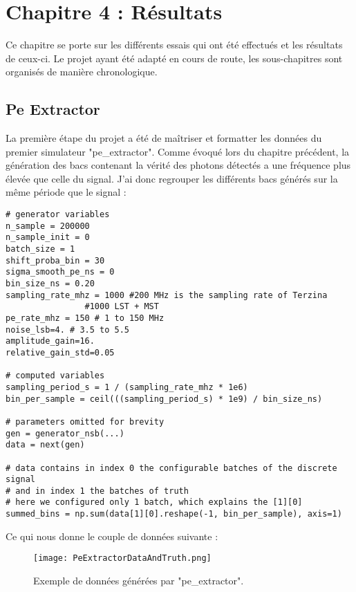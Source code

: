 \chapter{Chapitre 4 : Résultats}

Ce chapitre se porte sur les différents essais qui ont été effectués et les résultats de ceux-ci.
Le projet ayant été adapté en cours de route, les sous-chapitres sont organisés de manière chronologique.

\section{Pe Extractor}
La première étape du projet a été de maîtriser et formatter les données du premier simulateur "pe\_extractor".
Comme évoqué lors du chapitre précédent, la génération des bacs contenant la vérité des photons détectés
a une fréquence plus élevée que celle du signal.
J'ai donc regrouper les différents bacs générés sur la même période que le signal :

\begin{lstlisting}[language=iPython,caption={Regroupement des bacs de photons insérés, signal\_sense.ipynb},captionpos=b]
# generator variables
n_sample = 200000
n_sample_init = 0
batch_size = 1
shift_proba_bin = 30
sigma_smooth_pe_ns = 0
bin_size_ns = 0.20
sampling_rate_mhz = 1000 #200 MHz is the sampling rate of Terzina
				#1000 LST + MST
pe_rate_mhz = 150 # 1 to 150 MHz
noise_lsb=4. # 3.5 to 5.5
amplitude_gain=16.
relative_gain_std=0.05

# computed variables
sampling_period_s = 1 / (sampling_rate_mhz * 1e6)
bin_per_sample = ceil(((sampling_period_s) * 1e9) / bin_size_ns)

# parameters omitted for brevity
gen = generator_nsb(...)
data = next(gen)

# data contains in index 0 the configurable batches of the discrete signal
# and in index 1 the batches of truth
# here we configured only 1 batch, which explains the [1][0]
summed_bins = np.sum(data[1][0].reshape(-1, bin_per_sample), axis=1)
\end{lstlisting}

\newpage
Ce qui nous donne le couple de données suivante :
\begin{figure}[tbph!]
	\centering
	\texttt{[image: PeExtractorDataAndTruth.png]}
	\caption[Exemple de données générées par "pe\_extractor"]{Exemple de données générées par "pe\_extractor".}
\end{figure}


